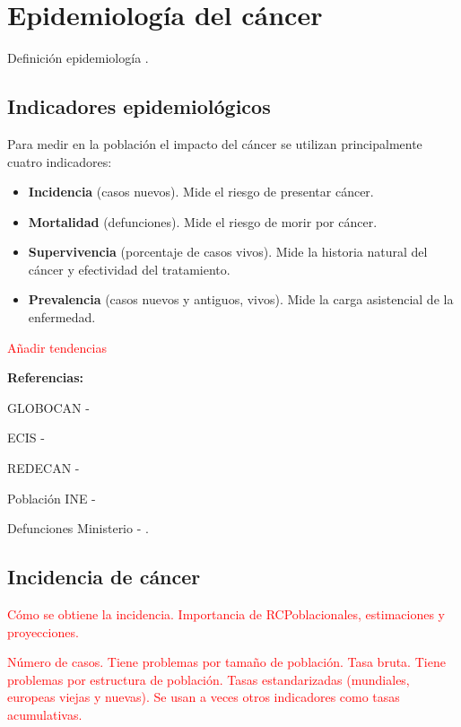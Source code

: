 \chapter{Epidemiología del cáncer}

Definición epidemiología \cite{IARC1999}.

\section{Indicadores epidemiológicos}

Para medir en la población el impacto del cáncer se utilizan principalmente cuatro indicadores:

\begin{itemize}
	\item \textbf{Incidencia} (casos nuevos). Mide el riesgo de presentar cáncer.
	\item \textbf{Mortalidad} (defunciones). Mide el riesgo de morir por cáncer.
	\item \textbf{Supervivencia} (porcentaje de casos vivos). Mide la historia natural del cáncer y efectividad del tratamiento.
	\item \textbf{Prevalencia} (casos nuevos y antiguos, vivos). Mide la carga asistencial de la enfermedad.
\end{itemize}

\textcolor{red}{Añadir tendencias}


\textbf{Referencias:}

GLOBOCAN - \cite{Bray2018, GCO}

ECIS - \cite{ECIS, ECIS2}

REDECAN - \cite{REDECAN2020}

Población INE - \cite{INEpob}

Defunciones Ministerio - \cite{MSCBS}.

\section{Incidencia de cáncer}

\textcolor{red}{Cómo se obtiene la incidencia. Importancia de RCPoblacionales, estimaciones y proyecciones.}

\textcolor{red}{Número de casos. Tiene problemas por tamaño de población. Tasa bruta. Tiene problemas por estructura de población. Tasas estandarizadas (mundiales, europeas viejas y nuevas). Se usan a veces otros indicadores como tasas acumulativas.}

